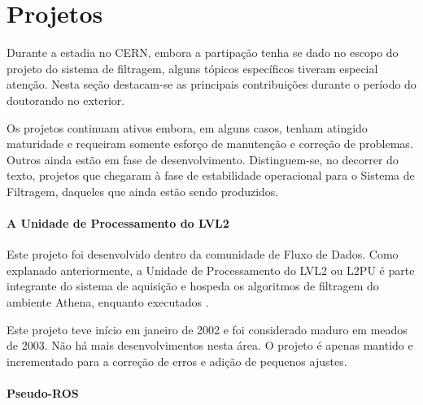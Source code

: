 \begin{quotation}
\end{quotation}

\section{Projetos}

Durante a estadia no CERN, embora a partipação tenha se dado no escopo do
projeto do sistema de filtragem, alguns tópicos específicos tiveram especial
atenção. Nesta seção destacam-se as principais contribuições durante o período
do doutorando no exterior.

Os projetos continuam ativos embora, em alguns casos, tenham atingido
maturidade e requeiram somente esforço de manutenção e correção de
problemas. Outros ainda estão em fase de desenvolvimento. Distinguem-se, no
decorrer do texto, projetos que chegaram à fase de estabilidade operacional
para o Sistema de Filtragem, daqueles que ainda estão sendo produzidos.

\paragraph{A Unidade de Processamento do LVL2}

Este projeto foi desenvolvido dentro da comunidade de Fluxo de Dados. Como
explanado anteriormente, a Unidade de Processamento do LVL2 ou L2PU é parte
integrante do sistema de aquisição e hospeda os algoritmos de filtragem do
ambiente Athena, enquanto executados .

Este projeto teve início em janeiro de 2002 e foi considerado maduro em meados
de 2003. Não há mais desenvolvimentos nesta área. O projeto é apenas mantido e
incrementado para a correção de erros e adição de pequenos ajustes.

\paragraph{Pseudo-ROS}

